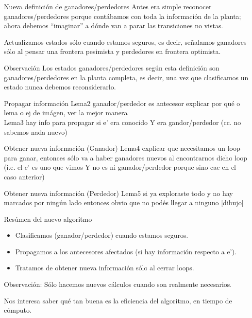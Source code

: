 \begin{frame}{Nueva definición de ganadores/perdedores}
    Antes era simple reconocer ganadores/perdedores porque contábamos con toda la información de la planta; ahora debemos ``imaginar'' a dónde van a parar las transiciones no vistas.
    
    Actualizamos estados sólo cuando estamos seguros, es decir, señalamos ganadores sólo al pensar una frontera pesimista y perdedores en frontera optimista.
    
    \begin{block}{Observación}
        Los estados ganadores/perdedores según esta definición son ganadores/perdedores en la planta completa, es decir, una vez que clasificamos un estado nunca debemos reconsiderarlo.
    \end{block}
\end{frame}
\begin{frame}{Propagar información}
    Lema2 ganador/perdedor es antecesor explicar por qué o lema o ej de imágen, ver la mejor manera\\
    Lema3 hay info para propagar si e' era conocido Y era gandor/perdedor (cc. no sabemos nada nuevo)
\end{frame}
\begin{frame}{Obtener nueva información (Ganador)}
    Lema4 explicar que necesitamos un loop para ganar, entonces sólo va a haber ganadores nuevos al encontrarnos dicho loop (i.e. el e' es uno que vimos Y no es ni ganador/perdedor porque sino cae en el caso anterior)
\end{frame}
\begin{frame}{Obtener nueva información (Perdedor)}
    Lema5 si ya exploraste todo y no hay marcados por ningún lado entonces obvio que no podés llegar a ninguno [dibujo]
\end{frame}
\begin{frame}{Resúmen del nuevo algoritmo}
    \begin{itemize}
     \item Clasificamos (ganador/perdedor) cuando estamos seguros. %
     \item Propagamos a los antecesores afectados (si hay información respecto a e').
     \item Tratamos de obtener nueva información sólo al cerrar loops.
    \end{itemize}
    
    \begin{block}{Observación:}
        Sólo hacemos nuevos cálculos cuando son realmente necesarios.
    \end{block}
    
    Nos interesa saber qué tan buena es la eficiencia del algoritmo, en tiempo de cómputo.
\end{frame}


